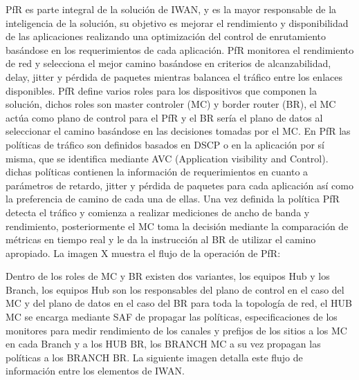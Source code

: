 PfR es parte integral de la solución de IWAN, y es la mayor responsable de la inteligencia de la solución, su objetivo es mejorar el rendimiento y disponibilidad de las aplicaciones realizando una optimización del control de enrutamiento basándose en los requerimientos de cada aplicación. PfR monitorea el rendimiento de red y selecciona el mejor camino basándose en criterios de alcanzabilidad, delay, jitter y pérdida de paquetes mientras balancea el tráfico entre los enlaces disponibles.
PfR define varios roles para los dispositivos que componen la solución, dichos roles son master controler (MC) y border router (BR), el MC actúa como plano de control para el PfR y el BR sería el plano de datos al seleccionar el camino basándose en las decisiones tomadas por el MC.
En PfR las políticas de tráfico son definidos basados en DSCP o en la aplicación por sí misma, que se identifica mediante AVC (Application visibility and Control). dichas políticas contienen la información de requerimientos en cuanto a parámetros de retardo, jitter y pérdida de paquetes para cada aplicación así como la preferencia de camino de cada una de ellas. Una vez definida la política PfR detecta el tráfico y comienza a realizar mediciones de ancho de banda y rendimiento, posteriormente el MC toma la decisión mediante la comparación de métricas en tiempo real y le da la instrucción al BR de utilizar el camino apropiado. La imagen X muestra el flujo de la operación de PfR:


Dentro de los roles de MC y BR existen dos variantes, los equipos Hub y los Branch, los equipos Hub son los responsables del plano de control en el caso del MC y del plano de datos en el caso del BR para toda la topología de red, el HUB MC se encarga mediante SAF de propagar las políticas, especificaciones de los monitores para medir rendimiento de los canales y prefijos de los sitios a los MC en cada Branch y a los HUB BR, los BRANCH MC a su vez propagan las políticas a los BRANCH BR. La siguiente imagen detalla este flujo de información entre los elementos de IWAN. 

\newpage

